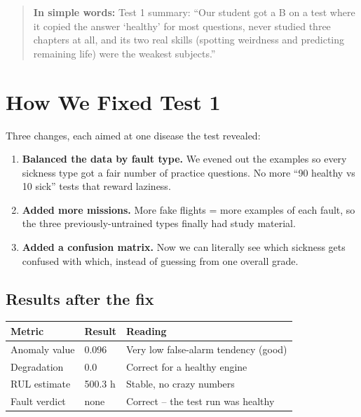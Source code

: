\documentclass[11pt]{article}
\newenvironment{simplebox}
  {\par\medskip\noindent\begin{quote}\color{blue!55!black}\small
   \textbf{\textsf{In simple words:}}\space\space}
  {\end{quote}\medskip}
\begin{document}
\begin{simplebox}
Test 1 summary: ``Our student got a B on a test where it copied the
answer `healthy' for most questions, never studied three chapters at all,
and its two real skills (spotting weirdness and predicting remaining life)
were the weakest subjects.''
\end{simplebox}

\section{How We Fixed Test 1}

Three changes, each aimed at one disease the test revealed:

\begin{enumerate}[nosep]
  \item \textbf{Balanced the data by fault type.} We evened out the
        examples so every sickness type got a fair number of practice
        questions. No more ``90 healthy vs 10 sick'' tests that reward
        laziness.
  \item \textbf{Added more missions.} More fake flights = more examples of
        each fault, so the three previously-untrained types finally had
        study material.
  \item \textbf{Added a confusion matrix.} Now we can literally see which
        sickness gets confused with which, instead of guessing from one
        overall grade.
\end{enumerate}

\subsection{Results after the fix}

\begin{center}
\begin{tabular}{lll}
\toprule
\textbf{Metric} & \textbf{Result} & \textbf{Reading} \\
\midrule
Anomaly value   & 0.096 & Very low false-alarm tendency (good) \\
Degradation     & 0.0   & Correct for a healthy engine \\
RUL estimate    & 500.3 h & Stable, no crazy numbers \\
Fault verdict   & none  & Correct -- the test run was healthy \\
\bottomrule
\end{tabular}
\end{center}
\end{document}
